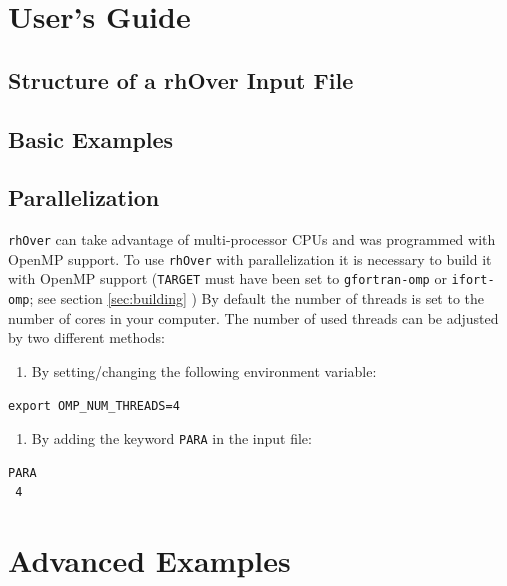 \documentclass[11pt]{article}
\begin{document}
\clearpage
\section{User's Guide}

\subsection{Structure of a rhOver Input File}

\subsection{Basic Examples}

\subsection{Parallelization}

\texttt{rhOver} can take advantage of multi-processor CPUs and was programmed with OpenMP support. 
To use \texttt{rhOver} with parallelization it is necessary to build it with OpenMP support (\texttt{TARGET} must have been set to \texttt{gfortran-omp} or \texttt{ifort-omp}; see section \ref{sec:building} )
By default the number of threads is set to the number of cores in your computer. The number of used threads can be adjusted by two different methods:

\begin{enumerate}[start=1]
 \item By setting/changing the following environment variable: 
\end{enumerate}

\begin{lstlisting}[frame=single,backgroundcolor=\color{bash}]
export OMP_NUM_THREADS=4
\end{lstlisting}

\begin{enumerate}[start=2]
 \item By adding the keyword \texttt{PARA} in the input file: 
\end{enumerate}

\begin{lstlisting}[frame=single]
PARA 
 4
\end{lstlisting}

\clearpage
\section{Advanced Examples}

\clearpage



\end{document}
